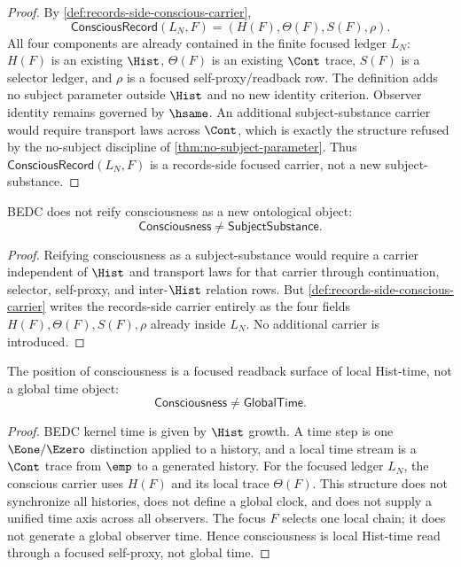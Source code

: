 \begin{proof}
By \autoref{def:records-side-conscious-carrier},
$$
\mathsf{ConsciousRecord}(L_N,F)
=
(H(F),\Theta(F),S(F),\rho).
$$
All four components are already contained in the finite focused ledger
$L_N$: $H(F)$ is an existing $\Hist$, $\Theta(F)$ is an existing
$\Cont$ trace, $S(F)$ is a selector ledger, and $\rho$ is a focused
self-proxy/readback row. The definition adds no subject parameter outside
$\Hist$ and no new identity criterion. Observer identity remains governed
by $\hsame$. An additional subject-substance carrier would require
transport laws across $\Cont$, which is exactly the structure refused by
the no-subject discipline of \autoref{thm:no-subject-parameter}. Thus
$\mathsf{ConsciousRecord}(L_N,F)$ is a records-side focused carrier, not a
new subject-substance.
\end{proof}

\begin{corollary}
\label{cor:consciousness-is-not-reified}
BEDC does not reify consciousness as a new ontological object:
$$
\mathsf{Consciousness}\neq\mathsf{SubjectSubstance}.
$$
\end{corollary}

\begin{proof}
Reifying consciousness as a subject-substance would require a carrier
independent of $\Hist$ and transport laws for that carrier through
continuation, selector, self-proxy, and inter-$\Hist$ relation rows. But
\autoref{def:records-side-conscious-carrier} writes the records-side
carrier entirely as the four fields $H(F),\Theta(F),S(F),\rho$ already
inside $L_N$. No additional carrier is introduced.
\end{proof}

\begin{theorem}
\label{thm:consciousness-local-hist-time-not-global-time}
The position of consciousness is a focused readback surface of local
Hist-time, not a global time object:
$$
\mathsf{Consciousness}\neq\mathsf{GlobalTime}.
$$
\end{theorem}

\begin{proof}
BEDC kernel time is given by $\Hist$ growth. A time step is one
$\Eone/\Ezero$ distinction applied to a history, and a local time stream is
a $\Cont$ trace from $\emp$ to a generated history. For the focused ledger
$L_N$, the conscious carrier uses $H(F)$ and its local trace $\Theta(F)$.
This structure does not synchronize all histories, does not define a
global clock, and does not supply a unified time axis across all observers.
The focus $F$ selects one local chain; it does not generate a global
observer time. Hence consciousness is local Hist-time read through a
focused self-proxy, not global time.
\end{proof}

